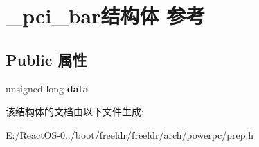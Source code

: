 \hypertarget{struct__pci__bar}{}\section{\+\_\+pci\+\_\+bar结构体 参考}
\label{struct__pci__bar}
\subsection*{Public 属性}
\begin{DoxyCompactItemize}
\item 
\mbox{\label{struct__pci__bar_aa858e95f99e358fa014d188d8a8a0992}} 
unsigned long {\bfseries data}
\end{DoxyCompactItemize}


该结构体的文档由以下文件生成\+:\begin{DoxyCompactItemize}
\item 
E\+:/\+React\+O\+S-\/0../boot/freeldr/freeldr/arch/powerpc/prep.\+h\end{DoxyCompactItemize}
